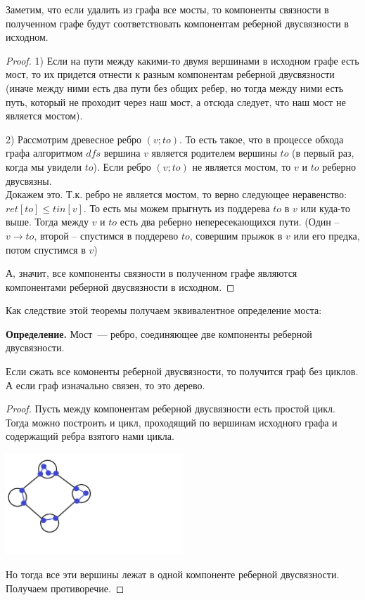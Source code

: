 \begin{theorem}
Заметим, что если удалить из графа все мосты, то компоненты связности в полученном графе будут соответствовать компонентам реберной двусвязности в исходном.
\end{theorem}
\begin{proof}

1) Если на пути между какими-то двумя вершинами в исходном графе есть мост, то их придется отнести к разным компонентам реберной двусвязности (иначе между ними есть два пути без общих ребер, но тогда между ними есть путь, который не проходит через наш мост, а отсюда следует, что наш мост не является мостом).

2) Рассмотрим древесное ребро $(v;to)$. То есть такое, что в процессе обхода графа алгоритмом $dfs$ вершина $v$ является родителем вершины $to$ (в первый раз, когда мы увидели $to$). Если ребро $(v;to)$ не является мостом, то $v$ и $to$ реберно двусвязны.\\

Докажем это. Т.к. ребро не является мостом, то верно следующее неравенство: $ret[to] \leq tin[v]$. То есть мы можем прыгнуть из поддерева $to$ в $v$ или куда-то выше. Тогда между $v$ и $to$ есть два реберно непересекающихся пути. (Один -- $v \to to$, второй -- спустимся в поддерево $to$, совершим прыжок в $v$ или его предка, потом спустимся в $v$)

А, значит, все компоненты связности в полученном графе являются компонентами реберной двусвязности в исходном.
\end{proof}

Как следствие этой теоремы получаем эквивалентное определение моста:

\textbf{Определение.} Мост~--- ребро, соединяющее две компоненты реберной двусвязности.

\begin{theorem}
Если сжать все комоненты реберной двусвязности, то получится граф без циклов. А если граф изначально связен, то это дерево.
\end{theorem}
\begin{proof}
Пусть между компонентам реберной двусвязности есть простой цикл. Тогда можно построить и цикл, проходящий по вершинам исходного графа и содержащий ребра взятого нами цикла.

\includegraphics[width=0.5\textwidth]{images/39_1.png}

Но тогда все эти вершины лежат в одной компоненте реберной двусвязности. Получаем противоречие.
\end{proof}